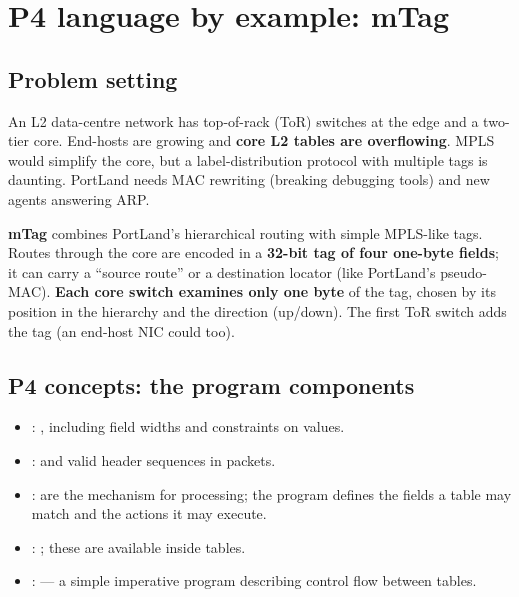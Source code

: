 \section{P4 language by example: mTag}
\subsection{Problem setting}
An L2 data-centre network has top-of-rack (ToR) switches at the edge and a two-tier core. End-hosts are growing and \textbf{core L2 tables are overflowing}. MPLS would simplify the core, but a label-distribution protocol with multiple tags is daunting. PortLand needs MAC rewriting (breaking debugging tools) and new agents answering ARP.

\textbf{mTag} combines PortLand's hierarchical routing with simple MPLS-like tags. Routes through the core are encoded in a \textbf{32-bit tag of four one-byte fields}; it can carry a ``source route'' or a destination locator (like PortLand's pseudo-MAC). \textbf{Each core switch examines only one byte} of the tag, chosen by its position in the hierarchy and the direction (up/down). The first ToR switch adds the tag (an end-host NIC could too).

\subsection{P4 concepts: the program components}
\begin{itemize}
\item {}: , including field widths and constraints on values.
\item {}:  and valid header sequences in packets.
\item {}:  are the mechanism for processing; the program defines the fields a table may match and the actions it may execute.
\item {}: ; these are available inside tables.
\item {}:  --- a simple imperative program describing control flow between tables.
\end{itemize}


